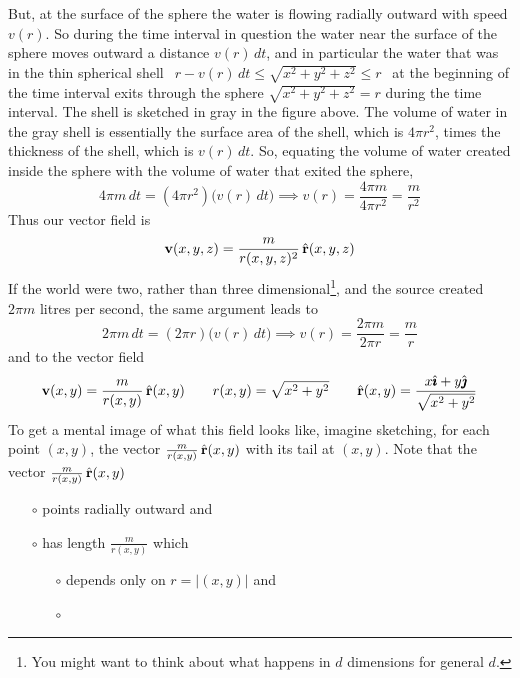 \begin{eg}
But, at the surface of the sphere the water is flowing radially outward 
with speed $v(r)$. So during the time interval in question the water near the surface of
the sphere moves outward a distance $v(r)\,dt$, and in particular the water 
that was in the thin spherical shell 
$\ \ r-v(r)\,dt \le \sqrt{x^2+y^2+z^2} \le r\ \ $ at the beginning of 
the time interval exits through the sphere $\sqrt{x^2+y^2+z^2} = r$ 
during the time interval. The shell is sketched in gray in the figure 
above. The volume of water in the gray shell is essentially the surface 
area of the shell, which is $4\pi r^2$, times the thickness of the 
shell, which is $v(r)\,dt$. So, equating the volume of water created inside 
the sphere with the volume of water that exited the sphere,
\begin{equation*}
4\pi m\,dt =  (4\pi r^2) \big(v(r)\,dt\big)
\implies v(r) = \frac{4\pi m}{4\pi r^2} =\frac{m}{r^2}
\end{equation*}
Thus our vector field is
\begin{equation*}
\mathbf{v}(x,y,z) = \frac{m}{r(x,y,z)^2}\,\hat{\mathbf{r}}(x,y,z)
\end{equation*}
If the world were two, rather than three dimensional\footnote{You might want to think about what happens in $d$ dimensions for general $d$.}, and the source
created $2\pi m$ litres per second, the same argument leads to
\begin{equation*}
2\pi m\,dt =  (2\pi r) \big(v(r)\,dt\big)
\implies v(r) = \frac{2\pi m}{2\pi r} =\frac{m}{r}
\end{equation*}
and to the vector field
\begin{equation*}
\mathbf{v}(x,y) = \frac{m}{r(x,y)}\,\hat{\mathbf{r}}(x,y)\qquad
r(x,y) = \sqrt{x^2+y^2}\qquad
\hat{\mathbf{r}}(x,y) = \frac{x\hat{\pmb{\imath}} + y\hat{\pmb{\jmath}}}{\sqrt{x^2+y^2}}
\end{equation*}
To get a mental image of what this field looks like, imagine
sketching, for each point $(x,y)$, the vector  
$\frac{m}{r(x,y)}\,\hat{\mathbf{r}}(x,y)$ with its tail at
$(x,y)$. Note that the vector  $\frac{m}{r(x,y)}\,\hat{\mathbf{r}}(x,y)$ 
\begin{itemize}\itemsep1pt \parskip0pt  %
\item[$\circ$]
points radially outward and
\item[$\circ$]
has length $\frac{m}{r(x,y)}$ which
\begin{itemize}\itemsep1pt \parskip0pt  %
\item[$\circ$]
depends only on $r=|(x,y)|$ and
\item[$\circ$]

\end{itemize}
\end{itemize}
\end{eg}
